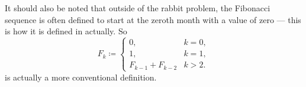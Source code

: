 \begin{example}
  It should also be noted that outside of the rabbit problem, the Fibonacci sequence is often defined to start at the zeroth month with a value of zero --- this is how it is defined in  actually. So
  \begin{equation}\label{eq:ex:fibonacci_rabbits}
    F_k \coloneqq \begin{cases}
      0,                &k = 0, \\
      1,                &k = 1, \\
      F_{k-1} + F_{k-2} &k > 2.
    \end{cases}
  \end{equation}
  is actually a more conventional definition.
\end{example}
